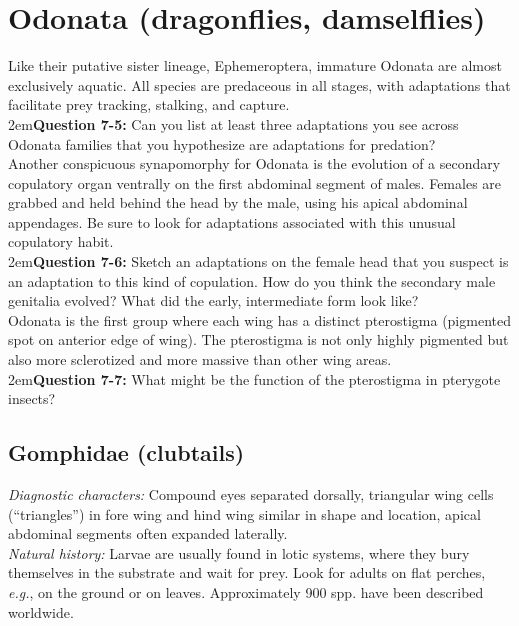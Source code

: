 \documentclass[letterpaper, 11pt]{article}
\begin{document}
\FloatBarrier

\section{Odonata (dragonflies, damselflies)}
Like their putative sister lineage, Ephemeroptera, immature Odonata are almost exclusively aquatic. All species are predaceous in all stages, with adaptations that facilitate prey tracking, stalking, and capture. \\

\hangindent2em\textbf{Question 7-5:} Can you list at least three adaptations you see across Odonata families that you hypothesize are adaptations for predation?\\

\noindent{}Another conspicuous synapomorphy for Odonata is the evolution of a secondary copulatory organ ventrally on the first abdominal segment of males. Females are grabbed and held behind the head by the male, using his apical abdominal appendages. Be sure to look for adaptations associated with this unusual copulatory habit.\\

\hangindent2em\textbf{Question 7-6:} Sketch an adaptations on the female head that you suspect is an adaptation to this kind of copulation. How do you think the secondary male genitalia evolved? What did the early, intermediate form look like?\\

\noindent{}Odonata is the first group where each wing has a distinct pterostigma (pigmented spot on anterior edge of wing). The pterostigma is not only highly pigmented but also more sclerotized and more massive than other wing areas. \\

\hangindent2em\textbf{Question 7-7:} What might be the function of the pterostigma in pterygote insects?\\

\subsection{Gomphidae (clubtails)}
\noindent{}\textit{Diagnostic characters:} Compound eyes separated dorsally, triangular wing cells (``triangles'') in fore wing and hind wing similar in shape and location, apical abdominal segments often expanded laterally.\\

\noindent{}\textit{Natural history:} Larvae are usually found in lotic systems, where they bury themselves in the substrate and wait for prey. Look for adults on flat perches, \textit{e.g.}, on the ground or on leaves. Approximately 900 spp. have been described worldwide.
\end{document}

